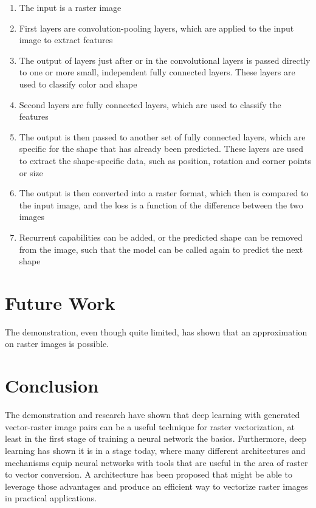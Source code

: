 \documentclass[12pt, a4paper, titlepage]{report}
\begin{document}
\begin{enumerate}
   \item The input is a raster image
   \item First layers are convolution-pooling layers, which are applied to the input image to extract features
   \item The output of layers just after or in the convolutional layers is passed directly to one or more small, independent fully connected layers. These layers are used to classify color and shape
   \item Second layers are fully connected layers, which are used to classify the features
   \item The output is then passed to another set of fully connected layers, which are specific for the shape that has already been predicted. These layers are used to extract the shape-specific data, such as position, rotation and corner points or size
   \item The output is then converted into a raster format, which then is compared to the input image, and the loss is a function of the difference between the two images

   \item Recurrent capabilities can be added, or the predicted shape can be removed from the image, such that the model can be called again to predict the next shape
\end{enumerate}

\section{Future Work}

The demonstration, even though quite limited, has shown that an approximation on raster images is possible.

\section{Conclusion}

The demonstration and research have shown that deep learning with generated vector-raster image pairs can be a useful technique for raster vectorization, at least in the first stage of training a neural network the basics.
Furthermore, deep learning has shown it is in a stage today, where many different architectures and mechanisms equip neural networks with tools that are useful in the area of raster to vector conversion. A architecture has been proposed that might be able to leverage those advantages and produce an efficient way to vectorize raster images in practical applications.
\end{document}
